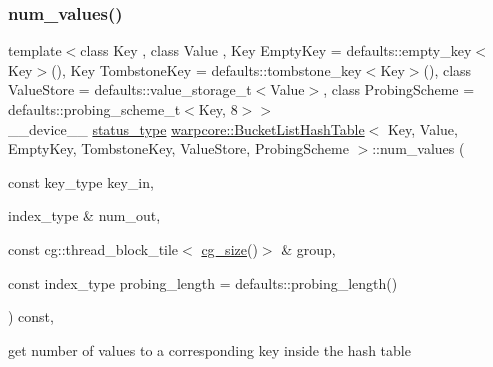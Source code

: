 \subsubsection{\texorpdfstring{num\+\_\+values()}{num\_values()}\hspace{0.1cm}{\footnotesize\ttfamily [1/3]}}
{\footnotesize\ttfamily template$<$class Key , class Value , Key Empty\+Key = defaults\+::empty\+\_\+key$<$\+Key$>$(), Key Tombstone\+Key = defaults\+::tombstone\+\_\+key$<$\+Key$>$(), class Value\+Store  = defaults\+::value\+\_\+storage\+\_\+t$<$\+Value$>$, class Probing\+Scheme  = defaults\+::probing\+\_\+scheme\+\_\+t$<$\+Key, 8$>$$>$ \\
\+\_\+\+\_\+device\+\_\+\+\_\+ \hyperlink{classwarpcore_1_1Status}{status\+\_\+type} \hyperlink{classwarpcore_1_1BucketListHashTable}{warpcore\+::\+Bucket\+List\+Hash\+Table}$<$ Key, Value, Empty\+Key, Tombstone\+Key, Value\+Store, Probing\+Scheme $>$\+::num\+\_\+values (\begin{DoxyParamCaption}\item[{const key\+\_\+type}]{key\+\_\+in,  }\item[{index\+\_\+type \&}]{num\+\_\+out,  }\item[{const cg\+::thread\+\_\+block\+\_\+tile$<$ \hyperlink{classwarpcore_1_1BucketListHashTable_a3807ac1b39b47617d862c5dd17f21330}{cg\+\_\+size}()$>$ \&}]{group,  }\item[{const index\+\_\+type}]{probing\+\_\+length = {\ttfamily defaults\+:\+:probing\+\_\+length()} }\end{DoxyParamCaption}) const\hspace{0.3cm}{\ttfamily [inline]}, {\ttfamily [noexcept]}}



get number of values to a corresponding key inside the hash table 


